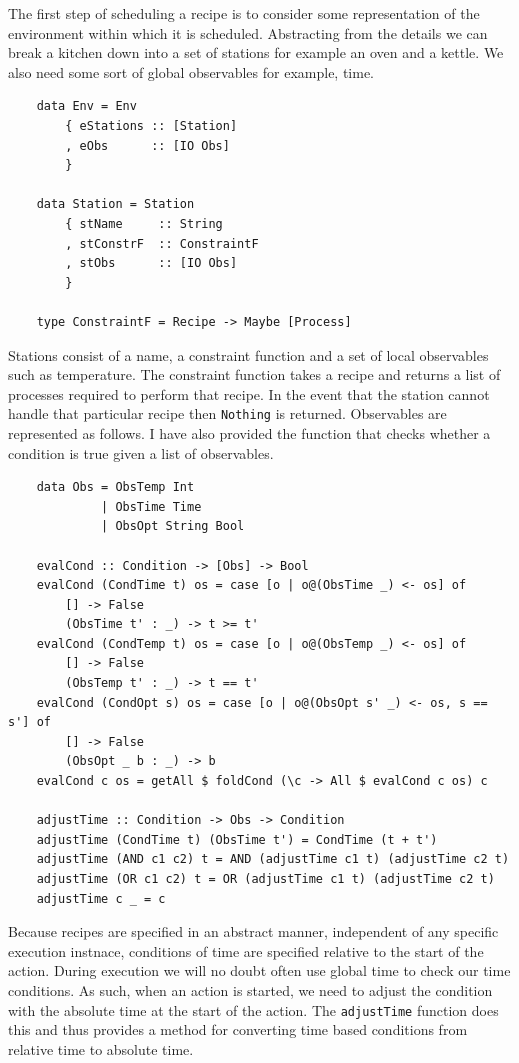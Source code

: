 \documentclass[11pt]{article}
\begin{document}
The first step of scheduling a recipe is to consider some representation of the
environment within which it is scheduled. Abstracting from the details we can
break a kitchen down into a set of stations for example an oven and a kettle.
We also need some sort of global observables for example, time.

\begin{lstlisting}
    data Env = Env
        { eStations :: [Station]
        , eObs      :: [IO Obs]
        }

    data Station = Station
        { stName     :: String
        , stConstrF  :: ConstraintF
        , stObs      :: [IO Obs]
        }

    type ConstraintF = Recipe -> Maybe [Process]
\end{lstlisting}

Stations consist of a name, a constraint function and a set of local observables such as temperature.
The constraint function takes a recipe and returns a list of processes required to perform that recipe.
In the event that the station cannot handle that particular recipe then \texttt{Nothing} is returned.
Observables are represented as follows. I have also provided the function that checks whether a
condition is true given a list of observables.

\begin{lstlisting}
    data Obs = ObsTemp Int
             | ObsTime Time
             | ObsOpt String Bool

    evalCond :: Condition -> [Obs] -> Bool
    evalCond (CondTime t) os = case [o | o@(ObsTime _) <- os] of
        [] -> False
        (ObsTime t' : _) -> t >= t'
    evalCond (CondTemp t) os = case [o | o@(ObsTemp _) <- os] of
        [] -> False
        (ObsTemp t' : _) -> t == t'
    evalCond (CondOpt s) os = case [o | o@(ObsOpt s' _) <- os, s == s'] of
        [] -> False
        (ObsOpt _ b : _) -> b
    evalCond c os = getAll $ foldCond (\c -> All $ evalCond c os) c

    adjustTime :: Condition -> Obs -> Condition
    adjustTime (CondTime t) (ObsTime t') = CondTime (t + t')
    adjustTime (AND c1 c2) t = AND (adjustTime c1 t) (adjustTime c2 t)
    adjustTime (OR c1 c2) t = OR (adjustTime c1 t) (adjustTime c2 t)
    adjustTime c _ = c
\end{lstlisting}

Because recipes are specified in an abstract manner, independent of any specific execution instnace,
conditions of time are specified relative to the start of the action. During execution we will no doubt
often use global time to check our time conditions. As such, when an action is started, we need to
adjust the condition with the absolute time at the start of the action. The \texttt{adjustTime} function
does this and thus provides a method for converting time based conditions from relative time to absolute time.
\end{document}
